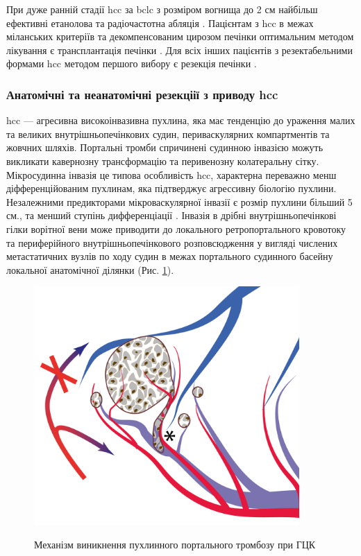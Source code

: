 \begin{refsection}
При дуже ранній стадії \acrshort{hcc} за \acrshort{bclc} з розміром вогнища до 2 см найбільш ефективні етанолова та радіочастотна абляція  \cite{Cucchetti2013}. Пацієнтам з \acrshort{hcc} в межах міланських критеріїв та декомпенсованим цирозом печінки оптимальним методом лікування є трансплантація печінки \cite{Colombo2016}. Для всіх інших пацієнтів з резектабельними формами \acrshort{hcc} методом першого вибору є резекція печінки \cite{Heimbach2018, Kudo2011}. 

\subsubsection{Анатомічні та неанатомічні резекціії з приводу \acrshort{hcc}}

\acrshort{hcc} --- агресивна високоінвазивна пухлина, яка має тенденцію до ураження малих та великих внутрішньопечінкових судин, периваскулярних компартментів та жовчних шляхів. Портальні тромби спричинені судинною інвазією можуть викликати кавернозну трансформацію та перивенозну колатеральну сітку. Мікросудинна інвазія це типова особливість \acrshort{hcc}, характерна переважно менш діфференційованим пухлинам, яка підтверджує агрессивну біологію пухлини. Незалежними предикторами мікроваскулярної інвазії є розмір пухлини більший 5 см., та менший ступінь дифференціації \cite{Zimmermann2017}. Інвазія в дрібні внутрішньопечінкові гілки ворітної вени може приводити до локального ретропортального кровотоку та периферійного внутрішньопечінкового розповсюдження у вигляді числених метастатичних вузлів по ходу судин в межах портального судинного басейну локальної анатомічної ділянки (Рис. \ref{fig:HCC_vascular_invasion}). 


\begin{figure}[h]
\caption{Механізм виникнення пухлинного портального тромбозу при ГЦК}
\includegraphics[width=0.9\textwidth]{Illustrations/Chapter_01/HCC_vascular_invasion.png}
\label{fig:HCC_vascular_invasion}


\end{figure}
\end{refsection}
